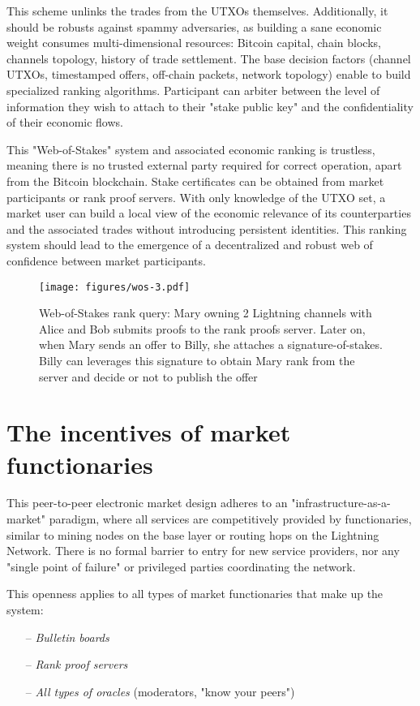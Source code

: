 \documentclass[pdflatex,sn-mathphys]{sn-jnl}%
\theoremstyle{thmstyleone}%
\theoremstyle{thmstyletwo}%
\theoremstyle{thmstylethree}%
\begin{document}
This scheme unlinks the trades from the UTXOs themselves. Additionally, it should be robusts against spammy adversaries, as building a sane economic weight consumes multi-dimensional resources: Bitcoin capital, chain blocks, channels topology, history of trade settlement. The base decision factors (channel UTXOs, timestamped offers, off-chain packets, network topology) enable to build specialized ranking algorithms. Participant can arbiter between the level of information they wish to attach to their "stake public key" and the confidentiality of their economic flows.

This "Web-of-Stakes" system and associated economic ranking is trustless, meaning there is no trusted external party required for correct operation, apart from the Bitcoin blockchain. Stake certificates can be obtained from market participants or rank proof servers. With only knowledge of the UTXO set, a market user can build a local view of the economic relevance of its counterparties and the associated trades without introducing persistent identities. This ranking system should lead to the emergence of a decentralized and robust web of confidence between market participants.

\begin{figure}[h]
    \centering
    \texttt{[image: figures/wos-3.pdf]}
    \caption{Web-of-Stakes rank query: Mary owning 2 Lightning channels with Alice and Bob submits proofs to the rank proofs server. Later on, when Mary sends an offer to Billy, she attaches a signature-of-stakes. Billy can leverages this signature to obtain Mary rank from the server and decide or not to publish the offer}
    \label{fig:web-of-stakes}
\end{figure}

\section{The incentives of market functionaries}

This peer-to-peer electronic market design adheres to an "infrastructure-as-a-market" paradigm, where all services are competitively provided by functionaries, similar to mining nodes on the base layer or routing hops on the Lightning Network. There is no formal barrier to entry for new service providers, nor any "single point of failure" or privileged parties coordinating the network.

This openness applies to all types of market functionaries that make up the system:
\begin{itemize}
    \item[--] \textit{Bulletin boards}
    \item[--] \textit{Rank proof servers}
    \item[--] \textit{All types of oracles} (moderators, "know your peers")
\end{itemize}
\end{document}

